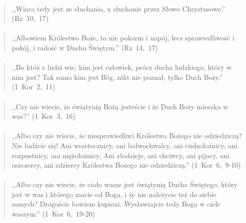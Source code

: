 \documentclass[10pt,a4paper,oneside]{article}
\begin{document}
\paragraph{}
\begin{quote}
,,Wiara tedy jest ze słuchania, a słuchanie przez Słowo Chrystusowe.'' \mbox{(Rz 10, 17)}
\end{quote}
\paragraph{}
\begin{quote}
,,Albowiem Królestwo Boże, to nie pokarm i napój, lecz sprawiedliwość i pokój, i radość w Duchu Świętym.'' \mbox{(Rz 14, 17)}
\end{quote}
\paragraph{}
\begin{quote}
,,Bo któż z ludzi wie, kim jest człowiek, prócz ducha ludzkiego, który w nim jest? Tak samo kim jest Bóg, nikt nie poznał, tylko Duch Boży.'' \mbox{(1 Kor 2, 11)}
\end{quote}
\paragraph{}
\begin{quote}
,,Czy nie wiecie, że świątynią Bożą jesteście i że Duch Boży mieszka w was?'' \mbox{(1 Kor 3, 16)}
\end{quote}
\paragraph{}
\begin{quote}
,,Albo czy nie wiecie, że niesprawiedliwi Królestwa Bożego nie odziedziczą? Nie łudźcie się! Ani wszetecznicy, ani bałwochwalcy, ani cudzołożnicy, ani rozpustnicy, ani mężołożnicy, Ani złodzieje, ani chciwcy, ani pijacy, ani oszczercy, ani zdziercy Królestwa Bożego nie odziedziczą.'' \mbox{(1 Kor 6, 9-10)}
\end{quote}
\paragraph{}
\begin{quote}
,,Albo czy nie wiecie, że ciało wasze jest świątynią Ducha Świętego, który jest w was i którego macie od Boga, i że nie należycie też do siebie samych? Drogoście bowiem kupieni. Wysławiajcie tedy Boga w ciele waszym.'' \mbox{(1 Kor 6, 19-20)}
\end{quote}
\end{document}
